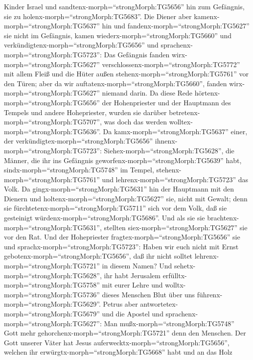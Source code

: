 Kinder Israel und sandtenx-morph=``strongMorph:TG5656'' hin zum
Gefängnis, sie zu holenx-morph=``strongMorph:TG5683''.  Die
Diener aber kamenx-morph=``strongMorph:TG5637'' hin und
fandenx-morph=``strongMorph:TG5627'' sie nicht im Gefängnis, kamen
wiederx-morph=``strongMorph:TG5660'' und
verkündigtenx-morph=``strongMorph:TG5656''  und
sprachenx-morph=``strongMorph:TG5723'': Das Gefängnis fanden
wirx-morph=``strongMorph:TG5627''
verschlossenx-morph=``strongMorph:TG5772'' mit allem Fleiß und die Hüter
außen stehenx-morph=``strongMorph:TG5761'' vor den Türen; aber da wir
auftatenx-morph=``strongMorph:TG5660'', fanden
wirx-morph=``strongMorph:TG5627'' niemand darin.  Da diese
Rede hörtenx-morph=``strongMorph:TG5656'' der Hohenpriester und der
Hauptmann des Tempels und andere Hohepriester, wurden sie darüber
betretenx-morph=``strongMorph:TG5707'', was doch das werden
wolltex-morph=``strongMorph:TG5636''.  Da
kamx-morph=``strongMorph:TG5637'' einer, der
verkündigtex-morph=``strongMorph:TG5656''
ihnenx-morph=``strongMorph:TG5723'':
Siehex-morph=``strongMorph:TG5628'', die Männer, die ihr ins Gefängnis
geworfenx-morph=``strongMorph:TG5639'' habt,
sindx-morph=``strongMorph:TG5748'' im Tempel,
stehenx-morph=``strongMorph:TG5761'' und
lehrenx-morph=``strongMorph:TG5723'' das Volk.  Da
gingx-morph=``strongMorph:TG5631'' hin der Hauptmann mit den Dienern und
holtenx-morph=``strongMorph:TG5627'' sie, nicht mit Gewalt; denn sie
fürchtetenx-morph=``strongMorph:TG5711'' sich vor dem Volk, daß sie
gesteinigt würdenx-morph=``strongMorph:TG5686''.  Und als
sie sie brachtenx-morph=``strongMorph:TG5631'', stellten
siex-morph=``strongMorph:TG5627'' sie vor den Rat. Und der Hohepriester
fragtex-morph=``strongMorph:TG5656'' sie  und
sprachx-morph=``strongMorph:TG5723'': Haben wir euch nicht mit Ernst
gebotenx-morph=``strongMorph:TG5656'', daß ihr nicht solltet
lehrenx-morph=``strongMorph:TG5721'' in diesem Namen? Und
sehetx-morph=``strongMorph:TG5628'', ihr habt Jerusalem
erfülltx-morph=``strongMorph:TG5758'' mit eurer Lehre und
wolltx-morph=``strongMorph:TG5736'' dieses Menschen Blut über uns
führenx-morph=``strongMorph:TG5629''.  Petrus aber
antwortetex-morph=``strongMorph:TG5679'' und die Apostel und
sprachenx-morph=``strongMorph:TG5627'': Man
mußx-morph=``strongMorph:TG5748'' Gott mehr
gehorchenx-morph=``strongMorph:TG5721'' denn den Menschen. 
Der Gott unserer Väter hat Jesus
auferwecktx-morph=``strongMorph:TG5656'', welchen ihr
erwürgtx-morph=``strongMorph:TG5668'' habt und an das Holz
